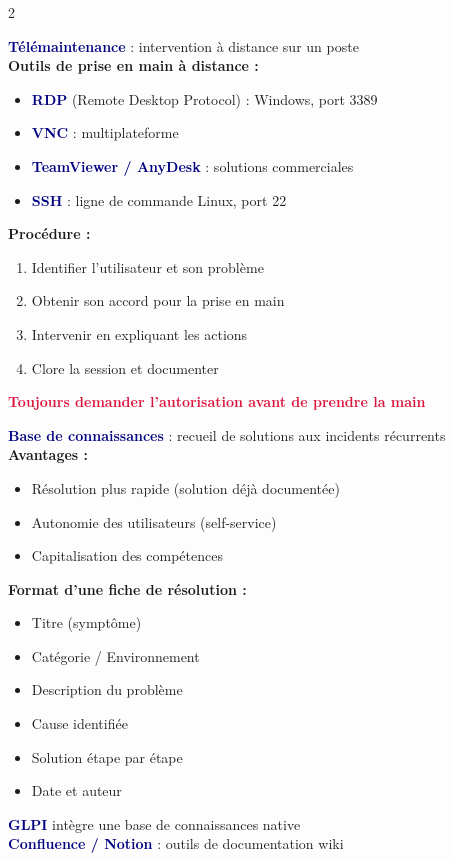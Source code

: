\documentclass[a4paper,10pt]{article}
\newcommand{\key}[1]{\textbf{\textcolor{navy}{#1}}}
\newcommand{\warn}[1]{\textbf{\textcolor{crimson}{#1}}}
\begin{document}
\begin{multicols}{2}
\begin{tcolorbox}[basebox, colframe=teal, title=9. Télémaintenance et assistance]
\key{Télémaintenance} : intervention à distance sur un poste \\[4pt]
\textbf{Outils de prise en main à distance :}
\begin{itemize}
  \item \key{RDP} (Remote Desktop Protocol) : Windows, port 3389
  \item \key{VNC} : multiplateforme
  \item \key{TeamViewer / AnyDesk} : solutions commerciales
  \item \key{SSH} : ligne de commande Linux, port 22
\end{itemize}
\vspace{4pt}
\textbf{Procédure :}
\begin{enumerate}
  \item Identifier l'utilisateur et son problème
  \item Obtenir son accord pour la prise en main
  \item Intervenir en expliquant les actions
  \item Clore la session et documenter
\end{enumerate}
\warn{Toujours demander l'autorisation avant de prendre la main}
\end{tcolorbox}

\begin{tcolorbox}[basebox, colframe=green, title=10. Documentation et base de connaissances]
\key{Base de connaissances} : recueil de solutions aux incidents récurrents \\[4pt]
\textbf{Avantages :}
\begin{itemize}
  \item Résolution plus rapide (solution déjà documentée)
  \item Autonomie des utilisateurs (self-service)
  \item Capitalisation des compétences
\end{itemize}
\vspace{4pt}
\textbf{Format d'une fiche de résolution :}
\begin{itemize}
  \item Titre (symptôme)
  \item Catégorie / Environnement
  \item Description du problème
  \item Cause identifiée
  \item Solution étape par étape
  \item Date et auteur
\end{itemize}
\vspace{4pt}
\key{GLPI} intègre une base de connaissances native \\
\key{Confluence / Notion} : outils de documentation wiki
\end{tcolorbox}

\end{multicols}
\end{document}
